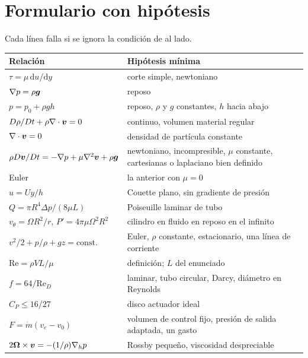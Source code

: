 \chapter{Formulario con hipótesis}
\label{ch:formulario}

Cada línea falla si se ignora la condición de al lado.

\begin{longtable}{@{}p{}p{}@{}}
\toprule
\textbf{Relación} & \textbf{Hipótesis mínima}\\
\midrule
\endhead
\(\tau=\mu\,\mathrm{d}u/\mathrm{d}y\) & corte simple, newtoniano \\
\(\nabla p=\rho\boldsymbol{g}\) & reposo \\
\(p=p_0+\rho g h\) & reposo, \(\rho\) y \(g\) constantes, \(h\) hacia abajo \\
\(D\rho/Dt+\rho\nabla\cdot\boldsymbol{v}=0\) & continuo, volumen material regular \\
\(\nabla\cdot\boldsymbol{v}=0\) & densidad de partícula constante \\
\(\rho D\boldsymbol{v}/Dt=-\nabla p+\mu\nabla^2\boldsymbol{v}+\rho\boldsymbol{g}\) & newtoniano, incompresible, \(\mu\) constante, cartesianas o laplaciano bien definido \\
Euler & la anterior con \(\mu=0\) \\
\(u=Uy/h\) & Couette plano, sin gradiente de presión \\
\(Q=\pi R^4\Delta p/(8\mu L)\) & Poiseuille laminar de tubo \\
\(v_\theta=\Omega R^2/r\), \(P'=4\pi\mu\Omega^2 R^2\) & cilindro en fluido en reposo en el infinito \\
\(v^2/2+p/\rho+gz=\mathrm{const.}\) & Euler, \(\rho\) constante, estacionario, una línea de corriente \\
\(\mathrm{Re}=\rho VL/\mu\) & definición; \(L\) del enunciado \\
\(f=64/\mathrm{Re}_D\) & laminar, tubo circular, Darcy, diámetro en Reynolds \\
\(C_P\le 16/27\) & disco actuador ideal \\
\(F=\dot m(v_e-v_0)\) & volumen de control fijo, presión de salida adaptada, un gasto \\
\(2\boldsymbol{\Omega}\times\boldsymbol{v}=-(1/\rho)\nabla_h p\) & Rossby pequeño, viscosidad despreciable \\
\bottomrule
\end{longtable}
